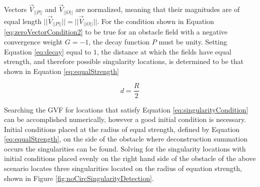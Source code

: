 \documentclass[numbered,pdftex]{ohio-etd}
\begin{document}
Vectors $\overrightarrow{V}_{||P||}$ and $\overrightarrow{V}_{||O||}$ are normalized, meaning that their magnitudes are of equal length $||\overrightarrow{V}_{||P||}||=||\overrightarrow{V}_{||O||}||$. For the condition shown in Equation \ref{eq:zeroVectorCondition2} to be true for an obstacle field with a negative convergence weight $G=-1$, the decay function $P$ must be unity. Setting Equation \ref{eq:decay} equal to $1$, the distance at which the fields have equal strength, and therefore possible singularity locations, is determined to be that shown in Equation \ref{eq:equalStrength}

\begin{equation}
\label{eq:equalStrength}
d = \frac{R}{2}
\end{equation}

Searching the GVF for locations that satisfy Equation \ref{eq:singularityCondition} can be accomplished numerically, however a good initial condition is necessary. Initial conditions placed at the radius of equal strength, defined by Equation \ref{eq:equalStrength}, on the side of the obstacle where deconstruction summation occurs the singularities can be found. Solving for the singularity locations with initial conditions placed evenly on the right hand side of the obstacle of the above scenario locates three singularities located on the radius of equation strength, shown in Figure \ref{fig:noCircSingularityDetection}.
\end{document}
